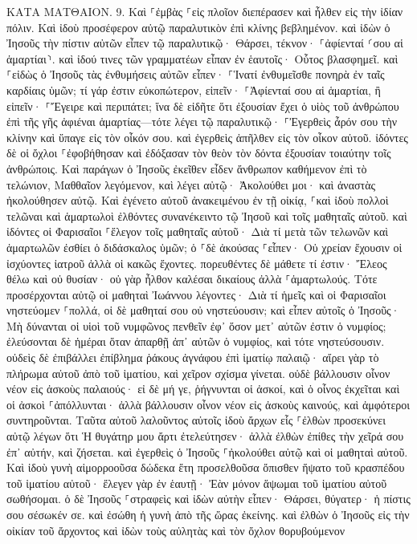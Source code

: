 \documentclass[twoside, 9pt]{extreport}
\begin{document}
ΚΑΤΑ ΜΑΤΘΑΙΟΝ.
9.
Καὶ ⸀ἐμβὰς ⸀εἰς πλοῖον διεπέρασεν καὶ ἦλθεν εἰς τὴν ἰδίαν πόλιν. 
Καὶ ἰδοὺ προσέφερον αὐτῷ παραλυτικὸν ἐπὶ κλίνης βεβλημένον. καὶ ἰδὼν ὁ Ἰησοῦς τὴν πίστιν αὐτῶν εἶπεν τῷ παραλυτικῷ· Θάρσει, τέκνον· ⸀ἀφίενταί ⸂σου αἱ ἁμαρτίαι⸃. 
καὶ ἰδού τινες τῶν γραμματέων εἶπαν ἐν ἑαυτοῖς· Οὗτος βλασφημεῖ. 
καὶ ⸀εἰδὼς ὁ Ἰησοῦς τὰς ἐνθυμήσεις αὐτῶν εἶπεν· ⸀Ἱνατί ἐνθυμεῖσθε πονηρὰ ἐν ταῖς καρδίαις ὑμῶν; 
τί γάρ ἐστιν εὐκοπώτερον, εἰπεῖν· ⸀Ἀφίενταί σου αἱ ἁμαρτίαι, ἢ εἰπεῖν· ⸀Ἔγειρε καὶ περιπάτει; 
ἵνα δὲ εἰδῆτε ὅτι ἐξουσίαν ἔχει ὁ υἱὸς τοῦ ἀνθρώπου ἐπὶ τῆς γῆς ἀφιέναι ἁμαρτίας—τότε λέγει τῷ παραλυτικῷ· ⸀Ἐγερθεὶς ἆρόν σου τὴν κλίνην καὶ ὕπαγε εἰς τὸν οἶκόν σου. 
καὶ ἐγερθεὶς ἀπῆλθεν εἰς τὸν οἶκον αὐτοῦ. 
ἰδόντες δὲ οἱ ὄχλοι ⸀ἐφοβήθησαν καὶ ἐδόξασαν τὸν θεὸν τὸν δόντα ἐξουσίαν τοιαύτην τοῖς ἀνθρώποις. 
Καὶ παράγων ὁ Ἰησοῦς ἐκεῖθεν εἶδεν ἄνθρωπον καθήμενον ἐπὶ τὸ τελώνιον, Μαθθαῖον λεγόμενον, καὶ λέγει αὐτῷ· Ἀκολούθει μοι· καὶ ἀναστὰς ἠκολούθησεν αὐτῷ. 
Καὶ ἐγένετο αὐτοῦ ἀνακειμένου ἐν τῇ οἰκίᾳ, ⸀καὶ ἰδοὺ πολλοὶ τελῶναι καὶ ἁμαρτωλοὶ ἐλθόντες συνανέκειντο τῷ Ἰησοῦ καὶ τοῖς μαθηταῖς αὐτοῦ. 
καὶ ἰδόντες οἱ Φαρισαῖοι ⸀ἔλεγον τοῖς μαθηταῖς αὐτοῦ· Διὰ τί μετὰ τῶν τελωνῶν καὶ ἁμαρτωλῶν ἐσθίει ὁ διδάσκαλος ὑμῶν; 
ὁ ⸀δὲ ἀκούσας ⸀εἶπεν· Οὐ χρείαν ἔχουσιν οἱ ἰσχύοντες ἰατροῦ ἀλλὰ οἱ κακῶς ἔχοντες. 
πορευθέντες δὲ μάθετε τί ἐστιν· Ἔλεος θέλω καὶ οὐ θυσίαν· οὐ γὰρ ἦλθον καλέσαι δικαίους ἀλλὰ ⸀ἁμαρτωλούς. 
Τότε προσέρχονται αὐτῷ οἱ μαθηταὶ Ἰωάννου λέγοντες· Διὰ τί ἡμεῖς καὶ οἱ Φαρισαῖοι νηστεύομεν ⸀πολλά, οἱ δὲ μαθηταί σου οὐ νηστεύουσιν; 
καὶ εἶπεν αὐτοῖς ὁ Ἰησοῦς· Μὴ δύνανται οἱ υἱοὶ τοῦ νυμφῶνος πενθεῖν ἐφ᾽ ὅσον μετ᾽ αὐτῶν ἐστιν ὁ νυμφίος; ἐλεύσονται δὲ ἡμέραι ὅταν ἀπαρθῇ ἀπ᾽ αὐτῶν ὁ νυμφίος, καὶ τότε νηστεύσουσιν. 
οὐδεὶς δὲ ἐπιβάλλει ἐπίβλημα ῥάκους ἀγνάφου ἐπὶ ἱματίῳ παλαιῷ· αἴρει γὰρ τὸ πλήρωμα αὐτοῦ ἀπὸ τοῦ ἱματίου, καὶ χεῖρον σχίσμα γίνεται. 
οὐδὲ βάλλουσιν οἶνον νέον εἰς ἀσκοὺς παλαιούς· εἰ δὲ μή γε, ῥήγνυνται οἱ ἀσκοί, καὶ ὁ οἶνος ἐκχεῖται καὶ οἱ ἀσκοὶ ⸀ἀπόλλυνται· ἀλλὰ βάλλουσιν οἶνον νέον εἰς ἀσκοὺς καινούς, καὶ ἀμφότεροι συντηροῦνται. 
Ταῦτα αὐτοῦ λαλοῦντος αὐτοῖς ἰδοὺ ἄρχων εἷς ⸀ἐλθὼν προσεκύνει αὐτῷ λέγων ὅτι Ἡ θυγάτηρ μου ἄρτι ἐτελεύτησεν· ἀλλὰ ἐλθὼν ἐπίθες τὴν χεῖρά σου ἐπ᾽ αὐτήν, καὶ ζήσεται. 
καὶ ἐγερθεὶς ὁ Ἰησοῦς ⸀ἠκολούθει αὐτῷ καὶ οἱ μαθηταὶ αὐτοῦ. 
Καὶ ἰδοὺ γυνὴ αἱμορροοῦσα δώδεκα ἔτη προσελθοῦσα ὄπισθεν ἥψατο τοῦ κρασπέδου τοῦ ἱματίου αὐτοῦ· 
ἔλεγεν γὰρ ἐν ἑαυτῇ· Ἐὰν μόνον ἅψωμαι τοῦ ἱματίου αὐτοῦ σωθήσομαι. 
ὁ δὲ Ἰησοῦς ⸀στραφεὶς καὶ ἰδὼν αὐτὴν εἶπεν· Θάρσει, θύγατερ· ἡ πίστις σου σέσωκέν σε. καὶ ἐσώθη ἡ γυνὴ ἀπὸ τῆς ὥρας ἐκείνης. 
καὶ ἐλθὼν ὁ Ἰησοῦς εἰς τὴν οἰκίαν τοῦ ἄρχοντος καὶ ἰδὼν τοὺς αὐλητὰς καὶ τὸν ὄχλον θορυβούμενον 
\end{document}
